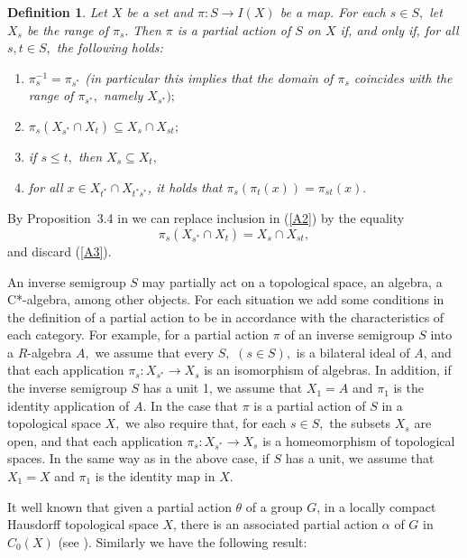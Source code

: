 \documentclass[11pt, a4paper]{amsart}
\theoremstyle{plain}
\newtheorem{definition}[theorem]{Definition}
\begin{document}
\begin{definition}\label{acaosemigroup2} 
Let $X$ be a set and $\pi : S \rightarrow I(X)$ be a map. For each $s \in S,$ let $X_s$ be the range of $\pi_s.$ Then $\pi$ is a  partial action of $S$ on $X$ if, and only if, for all $s, t \in S,$  the following holds:

\begin{enumerate}[{\rm (i)}]
\item\label{A1} $\pi_s^{-1}=\pi_{s^*}$  (in particular this implies that the domain of $\pi_s$ coincides with the range of $\pi_{s^*},$  namely $X_{s^*});$
\item\label{A2} $\pi_s(X_{s^*} \cap X_t ) \subseteq X_s \cap X_{st};$ 
\item\label{A3} if $s \leq t,$ then $X_s \subseteq X_t,$
\item\label{A4} for all $x \in X_{t^*}\cap X_{t^*s^*}$, it holds that $\pi_s(\pi_t(x))=\pi_{st}(x).$
\end{enumerate}
\end{definition}

By Proposition~3.4 in \cite{Buss} we can replace inclusion in (\ref{A2}) by the equality 
\begin{equation}\label{eqaction}
\pi_s(X_{s^*} \cap X_t )=X_s \cap X_{st},
\end{equation}
and discard (\ref{A3}).


An inverse semigroup $S$ may partially act on a topological space, an algebra, a C*-algebra, among other objects. For each situation we add some conditions in the definition of a partial action to be in accordance with the characteristics of each category. For example, for a partial action $\pi$ of an inverse semigroup $S$ into a $R$-algebra $A,$ we assume that every $S,$ $(s \in S),$ is a bilateral ideal of $A$, and that each application $\pi_s: X_{s^*} \rightarrow X_s$ is an isomorphism of algebras. In addition, if the inverse semigroup $S$ has a unit 1, we assume that $X_1 = A$ and $\pi_1$ is the identity application of $A.$ In the case that $\pi $ is a partial action of $S$ in a topological space $X,$ we also require that, for each $s \in S, $ the subsets $X_s$ are open, and that each application $\pi_s: X_{s^*} \rightarrow X_s $ is a homeomorphism of topological spaces. In the same way as in the above case, if $S$ has a unit, we assume that $X_1 = X$ and $\pi_1$ is the identity map in $X.$

It well known that given a partial action $\theta$ of a group $G$, in a locally compact Hausdorff topological space $X$, there is an associated partial action $\alpha$ of $G$ in $C_0(X)$ (see \cite[Corollary~11.6]{ExelPartial}). Similarly we have the following result:
\end{document}

